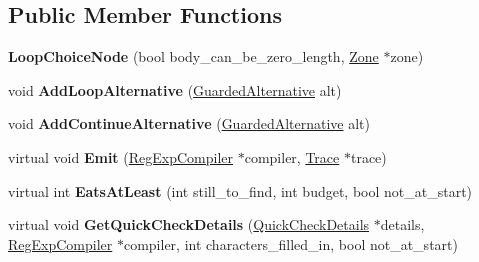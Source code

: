 \subsection*{Public Member Functions}
\begin{DoxyCompactItemize}
\item 
\hypertarget{classv8_1_1internal_1_1_loop_choice_node_aadfc784a1d1f92ae02c66c1b2f9cddea}{}{\bfseries Loop\+Choice\+Node} (bool body\+\_\+can\+\_\+be\+\_\+zero\+\_\+length, \hyperlink{classv8_1_1internal_1_1_zone}{Zone} $\ast$zone)\label{classv8_1_1internal_1_1_loop_choice_node_aadfc784a1d1f92ae02c66c1b2f9cddea}

\item 
\hypertarget{classv8_1_1internal_1_1_loop_choice_node_a815bc1ebd29be2a63d8d69991c3a44c1}{}void {\bfseries Add\+Loop\+Alternative} (\hyperlink{classv8_1_1internal_1_1_guarded_alternative}{Guarded\+Alternative} alt)\label{classv8_1_1internal_1_1_loop_choice_node_a815bc1ebd29be2a63d8d69991c3a44c1}

\item 
\hypertarget{classv8_1_1internal_1_1_loop_choice_node_a30882e49330a344892de6024e1a9138c}{}void {\bfseries Add\+Continue\+Alternative} (\hyperlink{classv8_1_1internal_1_1_guarded_alternative}{Guarded\+Alternative} alt)\label{classv8_1_1internal_1_1_loop_choice_node_a30882e49330a344892de6024e1a9138c}

\item 
\hypertarget{classv8_1_1internal_1_1_loop_choice_node_ae7f3eb93d0ed5bc473764b2db7729190}{}virtual void {\bfseries Emit} (\hyperlink{classv8_1_1internal_1_1_reg_exp_compiler}{Reg\+Exp\+Compiler} $\ast$compiler, \hyperlink{classv8_1_1internal_1_1_trace}{Trace} $\ast$trace)\label{classv8_1_1internal_1_1_loop_choice_node_ae7f3eb93d0ed5bc473764b2db7729190}

\item 
\hypertarget{classv8_1_1internal_1_1_loop_choice_node_adf3e929b831ea3c23156112a50a4c2f4}{}virtual int {\bfseries Eats\+At\+Least} (int still\+\_\+to\+\_\+find, int budget, bool not\+\_\+at\+\_\+start)\label{classv8_1_1internal_1_1_loop_choice_node_adf3e929b831ea3c23156112a50a4c2f4}

\item 
\hypertarget{classv8_1_1internal_1_1_loop_choice_node_a446b56f3550c63ef2b8a3a732e5f714b}{}virtual void {\bfseries Get\+Quick\+Check\+Details} (\hyperlink{classv8_1_1internal_1_1_quick_check_details}{Quick\+Check\+Details} $\ast$details, \hyperlink{classv8_1_1internal_1_1_reg_exp_compiler}{Reg\+Exp\+Compiler} $\ast$compiler, int characters\+\_\+filled\+\_\+in, bool not\+\_\+at\+\_\+start)\label{classv8_1_1internal_1_1_loop_choice_node_a446b56f3550c63ef2b8a3a732e5f714b}


\end{DoxyCompactItemize}
